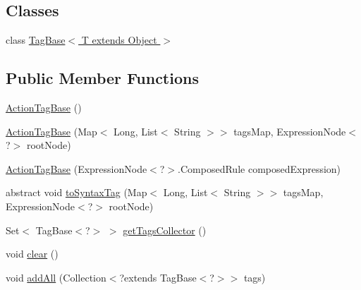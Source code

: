 \subsection*{Classes}
\begin{DoxyCompactItemize}
\item 
class \hyperlink{classit_1_1emarolab_1_1cagg_1_1core_1_1evaluation_1_1semanticGrammar_1_1syntaxCompiler_1_1Action35425350c71420bf03866231192ab9e7}{Tag\-Base$<$ T extends Object $>$}
\end{DoxyCompactItemize}
\subsection*{Public Member Functions}
\begin{DoxyCompactItemize}
\item 
\hyperlink{classit_1_1emarolab_1_1cagg_1_1core_1_1evaluation_1_1semanticGrammar_1_1syntaxCompiler_1_1ActionTagBase_a209a2134ace245f0dcc8ef35d0a3d829}{Action\-Tag\-Base} ()
\item 
\hyperlink{classit_1_1emarolab_1_1cagg_1_1core_1_1evaluation_1_1semanticGrammar_1_1syntaxCompiler_1_1ActionTagBase_abbbaa38033c195f47f0e8c362064fb57}{Action\-Tag\-Base} (Map$<$ Long, List$<$ String $>$$>$ tags\-Map, Expression\-Node$<$?$>$ root\-Node)
\item 
\hyperlink{classit_1_1emarolab_1_1cagg_1_1core_1_1evaluation_1_1semanticGrammar_1_1syntaxCompiler_1_1ActionTagBase_a664ac2ae86f4e5bfca72a614e3e3869f}{Action\-Tag\-Base} (Expression\-Node$<$?$>$.Composed\-Rule composed\-Expression)
\item 
abstract void \hyperlink{classit_1_1emarolab_1_1cagg_1_1core_1_1evaluation_1_1semanticGrammar_1_1syntaxCompiler_1_1ActionTagBase_ae4937afcddc128b4c3b1a1f36ec96e69}{to\-Syntax\-Tag} (Map$<$ Long, List$<$ String $>$$>$ tags\-Map, Expression\-Node$<$?$>$ root\-Node)
\item 
Set$<$ Tag\-Base$<$?$>$ $>$ \hyperlink{classit_1_1emarolab_1_1cagg_1_1core_1_1evaluation_1_1semanticGrammar_1_1syntaxCompiler_1_1ActionTagBase_ab86d6141b85c5033a6fab3f66773a4a2}{get\-Tags\-Collector} ()
\item 
void \hyperlink{classit_1_1emarolab_1_1cagg_1_1core_1_1evaluation_1_1semanticGrammar_1_1syntaxCompiler_1_1ActionTagBase_a1aaed69567bd52d42614765262dbda75}{clear} ()
\item 
void \hyperlink{classit_1_1emarolab_1_1cagg_1_1core_1_1evaluation_1_1semanticGrammar_1_1syntaxCompiler_1_1ActionTagBase_aa8c65d39f2d129d99455ec2ca895001c}{add\-All} (Collection$<$?extends Tag\-Base$<$?$>$$>$ tags)
$$
\end{DoxyCompactItemize}
